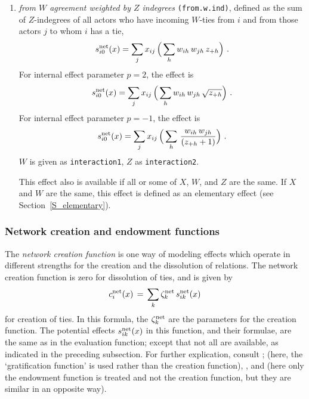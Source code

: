 \documentclass[a4paper,fleqn,11pt]{article}
\newcommand{\+}{\, + \,}
\newcommand{\vit}{\theenumi}
\newcounter{savenumi}
\begin{document}
\begin{enumerate}
\setcounter{enumi}{\value{savenumi}}
\item \emph{from $W$ agreement weighted by $Z$ indegrees} \texttt{(from.w.ind)},
      defined as the sum of $Z$-indegrees of all
      actors who have incoming $W$-ties from $i$ and from those actors
      $j$ to whom $i$ has a tie,
\[
 s^{\rm net}_{i\vit}(x) = \sum_j x_{ij}\,
        \Big( \sum_{h} w_{ih}\,w_{jh} \, z_{+h} \Big) \ .
\]
     For internal effect parameter $p=2$, the effect is
\[
 s^{\rm net}_{i\vit}(x) = \sum_j x_{ij}\,
        \Big( \sum_{h} w_{ih}\,w_{jh} \, \sqrt{ z_{+h}} \Big) \ .
\]
     For internal effect parameter $p=-1$, the effect is
\[
 s^{\rm net}_{i\vit}(x) = \sum_j x_{ij}\,
        \Big( \sum_{h} \, \frac{ w_{ih}\,w_{jh} }{( z_{+h}+1) } \Big) \ .
\]
    $W$ is given as \texttt{interaction1}, $Z$ as \texttt{interaction2}.

    This effect also is available if all or some of $X$, $W$, and $Z$ are the same.
    If $X$ and $W$ are the same, this effect is defined as an elementary effect
    (see Section~\ref{S_elementary}).
\setcounter{savenumi}{\value{enumi}}
\end{enumerate}

\subsubsection{Network creation and endowment functions}
\label{S_c}
\label{S_e}

The \emph{network creation function}
is one way of modeling effects which operate in
different strengths for the creation and the dissolution of
relations.
The network creation function is zero for dissolution of ties,
and is given by
\begin{equation}
c^{\rm net}_i(x) \, = \, \sum_k \zeta_k^{\rm net} \, s^{\rm net}_{ik}(x)
                             \label{c_net}
\end{equation}
for creation of ties.
In this formula, the $\zeta_k^{\rm net}$
are the parameters for the creation function.
The potential effects $s^{\rm net}_{ik}(x) $ in this function, and their
formulae, are the same as in the evaluation function;
except that not all are available, as indicated in the preceding subsection.
For further explication, consult \citet{Snijders01, Snijders05};
(here, the `gratification function' is used rather than the creation function),
\citet*{SnijdersEA07}, and \citet*{SteglichEA10}
(here only the endowment function is treated and not the creation function,
but they are similar in an opposite way).
\end{document}
